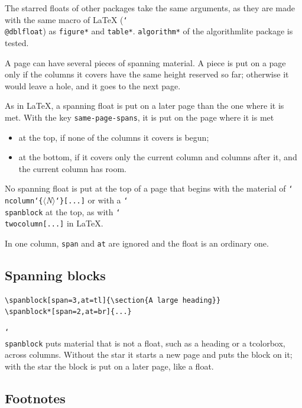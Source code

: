\documentclass{article}
\newcommand*\cs[1]{\texttt{\char`\\#1}}
\newcommand*\pkg[1]{\textsf{#1}}
\newcommand*\key[1]{\texttt{#1}}
\newcommand*\meta[1]{$\langle$\textit{#1}$\rangle$}
\newcommand*\marg[1]{\texttt{\char`\{}#1\texttt{\char`\}}}
\begin{document}
The starred floats of other packages take the same arguments, as they
are made with the same macro of \LaTeX{} (\cs{@dblfloat}) as
\texttt{figure*} and \texttt{table*}.  \texttt{algorithm*} of the
\pkg{algorithmlite} package is tested.

A page can have several pieces of spanning material.  A piece is put
on a page only if the columns it covers have the same height reserved
so far; otherwise it would leave a hole, and it goes to the next page.

As in \LaTeX, a spanning float is put on a later page than the one
where it is met.  With the key \key{same-page-spans}, it is put on the
page where it is met
\begin{itemize}
\item at the top, if none of the columns it covers is begun;
\item at the bottom, if it covers only the current column and columns
  after it, and the current column has room.
\end{itemize}
No spanning float is put at the top of a page that begins with the
material of \cs{ncolumn}\marg{\meta{N}}\texttt{[...]} or with a
\cs{spanblock} at the top, as with \cs{twocolumn}\texttt{[...]} in
\LaTeX.

In one column, \key{span} and \key{at} are ignored and the float is an
ordinary one.

\subsection{Spanning blocks}

\begin{verbatim}
\spanblock[span=3,at=tl]{\section{A large heading}}
\spanblock*[span=2,at=br]{...}
\end{verbatim}
\cs{spanblock} puts material that is not a float, such as a heading or
a \pkg{tcolorbox}, across columns.  Without the star it starts a new
page and puts the block on it; with the star the block is put on a
later page, like a float.

\subsection{Footnotes}
\end{document}
